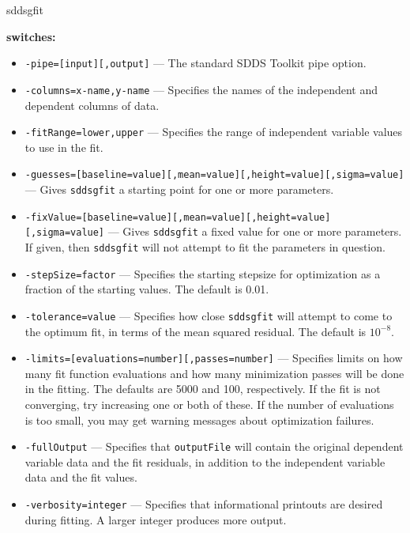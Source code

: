 \begin{sddsprog}{sddsgfit}
  \item \textbf{switches:}
  \begin{itemize}
    \item \verb|-pipe=[input][,output]| --- The standard SDDS Toolkit pipe option.
    \item \verb|-columns=x-name,y-name| --- Specifies the names of the independent and dependent columns of data.
    \item \verb|-fitRange=lower,upper| --- Specifies the range of independent variable values to use in the fit.
    \item \verb|-guesses=[baseline=value][,mean=value][,height=value][,sigma=value]| --- Gives \verb|sddsgfit| a starting
    point for one or more parameters.
    \item \verb|-fixValue=[baseline=value][,mean=value][,height=value][,sigma=value]| --- Gives \verb|sddsgfit| a fixed
    value for one or more parameters. If given, then \verb|sddsgfit| will not attempt to fit the parameters in question.
    \item \verb|-stepSize=factor| --- Specifies the starting stepsize for optimization as a fraction of the starting
    values. The default is 0.01.
    \item \verb|-tolerance=value| --- Specifies how close \verb|sddsgfit| will attempt to come to the optimum fit, in
    terms of the mean squared residual. The default is $10^{-8}$.
    \item \verb|-limits=[evaluations=number][,passes=number]| --- Specifies limits on how many fit function
    evaluations and how many minimization passes will be done in the fitting. The defaults are 5000 and 100,
    respectively. If the fit is not converging, try increasing one or both of these. If the number of evaluations is
    too small, you may get warning messages about optimization failures.
    \item \verb|-fullOutput| --- Specifies that \verb|outputFile| will contain the original dependent variable data and
    the fit residuals, in addition to the independent variable data and the fit values.
    \item \verb|-verbosity=integer| --- Specifies that informational printouts are desired during fitting. A larger
    integer produces more output.
  \end{itemize}


\end{sddsprog}
